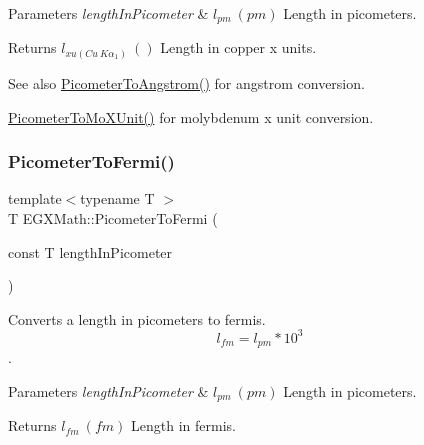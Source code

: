 \begin{DoxyParams}{Parameters}
{\em length\+In\+Picometer} & $ l_{pm}\ (pm)$ Length in picometers. \\
\hline
\end{DoxyParams}
\begin{DoxyReturn}{Returns}
$ l_{xu(Cu\ K\alpha_1)}\ ()$ Length in copper x units. 
\end{DoxyReturn}
\begin{DoxySeeAlso}{See also}
\mbox{\hyperlink{group___e_g_x_math-_conversions-_length_conversions-_picometer-_non-_s_i_ga0b1b4a3ec4ea0110477f4547025d2719}{Picometer\+To\+Angstrom()}} for angstrom conversion. 

\mbox{\hyperlink{group___e_g_x_math-_conversions-_length_conversions-_picometer-_non-_s_i_ga51b96b4bb30b7e9c971db81ff89a82f8}{Picometer\+To\+Mo\+X\+Unit()}} for molybdenum x unit conversion. 
\end{DoxySeeAlso}
\mbox{\label{group___e_g_x_math-_conversions-_length_conversions-_picometer-_non-_s_i_ga13ec47b0b50eca30313bb7902a28f0c9}} 
\subsubsection{\texorpdfstring{Picometer\+To\+Fermi()}{PicometerToFermi()}}
{\footnotesize\ttfamily template$<$typename T $>$ \\
T E\+G\+X\+Math\+::\+Picometer\+To\+Fermi (\begin{DoxyParamCaption}\item[{const T}]{length\+In\+Picometer }\end{DoxyParamCaption})}



Converts a length in picometers to fermis. \[ l_{fm}=l_{pm} * 10^{3} \]. 


\begin{DoxyParams}{Parameters}
{\em length\+In\+Picometer} & $ l_{pm}\ (pm)$ Length in picometers. \\
\hline
\end{DoxyParams}
\begin{DoxyReturn}{Returns}
$ l_{fm}\ (fm)$ Length in fermis. 
\end{DoxyReturn}
\mbox{\label{group___e_g_x_math-_conversions-_length_conversions-_picometer-_non-_s_i_gad8fddabe74b111596888c370081f725e}} 
